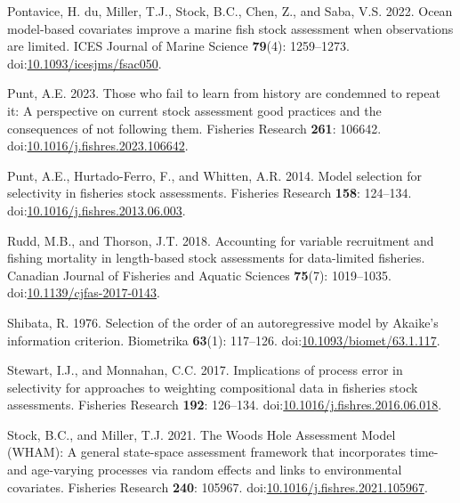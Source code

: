 \documentclass[
  12pt,
]{article}
\newlength{\cslhangindent}
\newenvironment{CSLReferences}[2] %
 {\begin{list}{}{%
  \setlength{\itemindent}{0pt}
  \setlength{\leftmargin}{0pt}
  \setlength{\parsep}{0pt}
  \ifodd #1
   \setlength{\leftmargin}{\cslhangindent}
   \setlength{\itemindent}{-1\cslhangindent}
  \fi
  \setlength{\itemsep}{#2\baselineskip}}}
 {\end{list}}
\begin{document}
\begin{CSLReferences}{1}{0}
Pontavice, H. du, Miller, T.J., Stock, B.C., Chen, Z., and Saba, V.S.
2022. Ocean model-based covariates improve a marine fish stock
assessment when observations are limited. ICES Journal of Marine Science
\textbf{79}(4): 1259--1273.
doi:\href{https://doi.org/10.1093/icesjms/fsac050}{10.1093/icesjms/fsac050}.

Punt, A.E. 2023. Those who fail to learn from history are condemned to
repeat it: A perspective on current stock assessment good practices and
the consequences of not following them. Fisheries Research \textbf{261}:
106642.
doi:\href{https://doi.org/10.1016/j.fishres.2023.106642}{10.1016/j.fishres.2023.106642}.

Punt, A.E., Hurtado-Ferro, F., and Whitten, A.R. 2014. Model selection
for selectivity in fisheries stock assessments. Fisheries Research
\textbf{158}: 124--134.
doi:\href{https://doi.org/10.1016/j.fishres.2013.06.003}{10.1016/j.fishres.2013.06.003}.

Rudd, M.B., and Thorson, J.T. 2018. Accounting for variable recruitment
and fishing mortality in length-based stock assessments for data-limited
fisheries. Canadian Journal of Fisheries and Aquatic Sciences
\textbf{75}(7): 1019--1035.
doi:\href{https://doi.org/10.1139/cjfas-2017-0143}{10.1139/cjfas-2017-0143}.

Shibata, R. 1976. Selection of the order of an autoregressive model by
{A}kaike's information criterion. Biometrika \textbf{63}(1): 117--126.
doi:\href{https://doi.org/10.1093/biomet/63.1.117}{10.1093/biomet/63.1.117}.

Stewart, I.J., and Monnahan, C.C. 2017. Implications of process error in
selectivity for approaches to weighting compositional data in fisheries
stock assessments. Fisheries Research \textbf{192}: 126--134.
doi:\href{https://doi.org/10.1016/j.fishres.2016.06.018}{10.1016/j.fishres.2016.06.018}.

Stock, B.C., and Miller, T.J. 2021. The {W}oods {H}ole {A}ssessment
{M}odel ({WHAM}): {A} general state-space assessment framework that
incorporates time- and age-varying processes via random effects and
links to environmental covariates. Fisheries Research \textbf{240}:
105967.
doi:\href{https://doi.org/10.1016/j.fishres.2021.105967}{10.1016/j.fishres.2021.105967}.


\end{CSLReferences}
\end{document}

